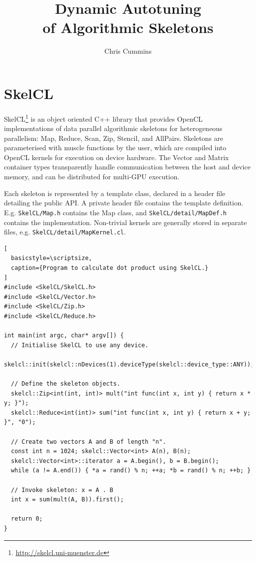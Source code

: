 
\title{Dynamic Autotuning\\of Algorithmic Skeletons}

\author{Chris Cummins}







\section{SkelCL}

SkelCL\footnote{\url{http://skelcl.uni-muenster.de}} is an object
oriented C++ library that provides OpenCL implementations of data
parallel algorithmic skeletons for heterogeneous parallelism: Map,
Reduce, Scan, Zip, Stencil, and AllPairs. Skeletons are parameterised
with muscle functions by the user, which are compiled into OpenCL
kernels for execution on device hardware. The Vector and Matrix
container types transparently handle communication between the host
and device memory, and can be distributed for multi-GPU execution.

Each skeleton is represented by a template class, declared in a header
file detailing the public API. A private header file contains the
template definition. E.g. \texttt{SkelCL/Map.h} contains the Map
class, and \texttt{SkelCL/detail/MapDef.h} contains the
implementation. Non-trivial kernels are generally stored in separate
files, e.g. \texttt{SkelCL/detail/MapKernel.cl}.

\lstset{language=C++}
\begin{lstlisting}[
  basicstyle=\scriptsize,
  caption={Program to calculate dot product using SkelCL.}
]
#include <SkelCL/SkelCL.h>
#include <SkelCL/Vector.h>
#include <SkelCL/Zip.h>
#include <SkelCL/Reduce.h>

int main(int argc, char* argv[]) {
  // Initialise SkelCL to use any device.
  skelcl::init(skelcl::nDevices(1).deviceType(skelcl::device_type::ANY));

  // Define the skeleton objects.
  skelcl::Zip<int(int, int)> mult("int func(int x, int y) { return x * y; }");
  skelcl::Reduce<int(int)> sum("int func(int x, int y) { return x + y; }", "0");

  // Create two vectors A and B of length "n".
  const int n = 1024; skelcl::Vector<int> A(n), B(n);
  skelcl::Vector<int>::iterator a = A.begin(), b = B.begin();
  while (a != A.end()) { *a = rand() % n; ++a; *b = rand() % n; ++b; }

  // Invoke skeleton: x = A . B
  int x = sum(mult(A, B)).first();

  return 0;
}
\end{lstlisting}

